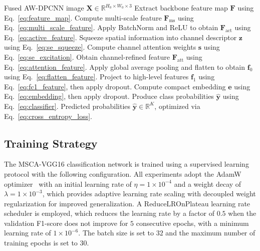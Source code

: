 \documentclass[journal]{IEEEtran}
\begin{document}
\begin{algorithm}
\caption{Forward Pass of MSCA-VGG16}
\label{alg:msca_vgg16}
\begin{algorithmic}[1]
\Require Fused AW-DPCNN image $\boldsymbol{X} \in \mathbb{R}^{H_0 \times W_0 \times 3}$
\State Extract backbone feature map $\boldsymbol{F}$ using Eq.~\ref{eq:feature_map}.
\State Compute multi-scale feature $\boldsymbol{F}_{\mathrm{ms}}$ using Eq.~\ref{eq:multi_scale_feature}.
\State Apply BatchNorm and ReLU to obtain $\boldsymbol{F}_{\mathrm{act}}$ using Eq.~\ref{eq:active_feature}.
\State Squeeze spatial information into channel descriptor $\boldsymbol{z}$ using Eq.~\ref{eq:se_squeeze}.
\State Compute channel attention weights $\boldsymbol{s}$ using Eq.~\ref{eq:se_excitation}.
\State Obtain channel-refined feature $\boldsymbol{F}_{\mathrm{att}}$ using Eq.~\ref{eq:attention_feature}.
\State Apply global average pooling and flatten to obtain $\boldsymbol{f}_0$ using Eq.~\ref{eq:flatten_feature}.
\State Project to high-level features $\boldsymbol{f}_1$ using Eq.~\ref{eq:fc1_feature}, then apply dropout.
\State Compute compact embedding $\boldsymbol{e}$ using Eq.~\ref{eq:embedding}, then apply dropout.
\State Produce class probabilities $\hat{\boldsymbol{y}}$ using Eq.~\ref{eq:classifier}.
\Ensure Predicted probabilities $\hat{\boldsymbol{y}} \in \mathbb{R}^{K}$, optimized via Eq.~\ref{eq:cross_entropy_loss}.
\end{algorithmic}
\end{algorithm}

\subsection{Training Strategy}

The MSCA-VGG16 classification network is trained using a supervised learning protocol with the following configuration. All experiments adopt the AdamW optimizer~\cite{loshchilov2017adamw} with an initial learning rate of $\eta = 1 \times 10^{-4}$ and a weight decay of $\lambda = 1 \times 10^{-3}$, which provides adaptive learning rate scaling with decoupled weight regularization for improved generalization. A ReduceLROnPlateau learning rate scheduler is employed, which reduces the learning rate by a factor of $0.5$ when the validation F1-score does not improve for $5$ consecutive epochs, with a minimum learning rate of $1 \times 10^{-6}$. The batch size is set to $32$ and the maximum number of training epochs is set to $30$.
\end{document}
